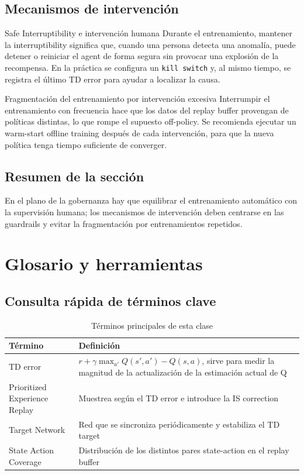 \documentclass[a4paper]{article}
\begin{document}
\subsection{Mecanismos de intervención}

\begin{importantbox}{Safe Interruptibility e intervención humana}
Durante el entrenamiento, mantener la interruptibility significa que, cuando una persona detecta una anomalía, puede detener o reiniciar el agent de forma segura sin provocar una explosión de la recompensa. En la práctica se configura un \texttt{kill switch} y, al mismo tiempo, se registra el último TD error para ayudar a localizar la causa.
\end{importantbox}

\begin{warningbox}{Fragmentación del entrenamiento por intervención excesiva}
Interrumpir el entrenamiento con frecuencia hace que los datos del replay buffer provengan de políticas distintas, lo que rompe el supuesto off-policy. Se recomienda ejecutar un warm-start offline training después de cada intervención, para que la nueva política tenga tiempo suficiente de converger.
\end{warningbox}

\subsection{Resumen de la sección}

En el plano de la gobernanza hay que equilibrar el entrenamiento automático con la supervisión humana; los mecanismos de intervención deben centrarse en las guardrails y evitar la fragmentación por entrenamientos repetidos.
\section{Glosario y herramientas}

\subsection{Consulta rápida de términos clave}

\begin{table}[H]
\centering
\begin{tabular}{lp{10cm}}
\toprule
Término & Definición \\
\midrule
TD error & $r + \gamma \max_{a'} Q(s', a') - Q(s, a)$, sirve para medir la magnitud de la actualización de la estimación actual de Q \\
Prioritized Experience Replay & Muestrea según el TD error e introduce la IS correction \\
Target Network & Red que se sincroniza periódicamente y estabiliza el TD target \\
State Action Coverage & Distribución de los distintos pares state-action en el replay buffer \\
\bottomrule
\end{tabular}
\caption{Términos principales de esta clase}
\end{table}
\end{document}
